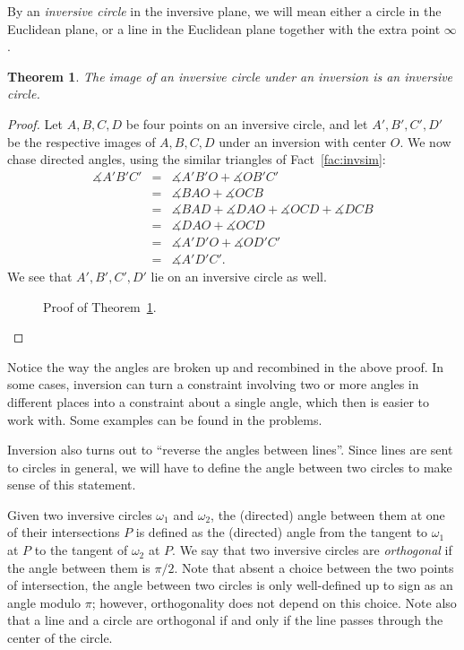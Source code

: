 \documentclass[12pt]{book}
\numberwithin{exc}{section}
\numberwithin{figure}{section}
\newtheorem{theorem}{Theorem}[section]
\numberwithin{equation}{theorem}
\def\beqa{\begin{eqnarray*}}
\def\eeqa{\end{eqnarray*}}
\def\dang{\measuredangle} %
\begin{document}
By an \emph{inversive circle} 
 in the inversive plane, we will mean either 
a circle in the Euclidean plane, or a line in the Euclidean plane together
with the extra point $\infty$.
\begin{theorem} \label{thm:invcirc}
The image of an inversive circle under an inversion is an inversive circle.
\end{theorem}
\begin{proof}
Let $A,B,C,D$ be four points on an inversive circle, and 
let $A',B',C',D'$ be the respective images of $A,B,C,D$ under an
inversion with center $O$. We now chase directed angles, using 
the similar triangles of Fact~\ref{fac:invsim}:
\beqa
\dang A'B'C' &=& \dang A'B'O + \dang OB'C' \\
&=& \dang BAO + \dang OCB \\
&=& \dang BAD + \dang DAO + \dang OCD + \dang DCB \\
&=& \dang DAO + \dang OCD \\
&=& \dang A'D'O + \dang OD'C' \\
&=& \dang A'D'C'.
\eeqa
We see that $A',B',C',D'$ lie on an inversive circle as well.
\begin{figure}[ht]
\caption{Proof of Theorem~\ref{thm:invcirc}.}
\end{figure}
\end{proof}

Notice the way the angles are broken up and recombined in the above 
proof. In some cases, inversion can turn a constraint involving two or 
more angles in different places into a constraint about a single 
angle, which then is easier to work with. Some examples can be found 
in the problems.

Inversion also turns out to ``reverse the angles between lines''.
Since lines are 
sent to circles in general, we will have to define the angle between 
two circles to make sense of this statement. 

Given two inversive 
circles $\omega_{1}$ and $\omega_{2}$, the (directed) angle between 
them 
at one of their intersections $P$ is defined as the (directed) 
angle from the tangent to $\omega_{1}$ at $P$ to the tangent of 
$\omega_{2}$ at $P$. We say that two inversive 
circles are \emph{orthogonal} 
if the angle between them is $\pi/2$.
Note that absent a choice between the two points of intersection,
the angle between two 
circles is only well-defined up to sign as an angle modulo $\pi$;
however, orthogonality does not depend on this choice. Note also
that a line and a circle are orthogonal if and only if the line passes
through the center of the circle.
\end{document}
